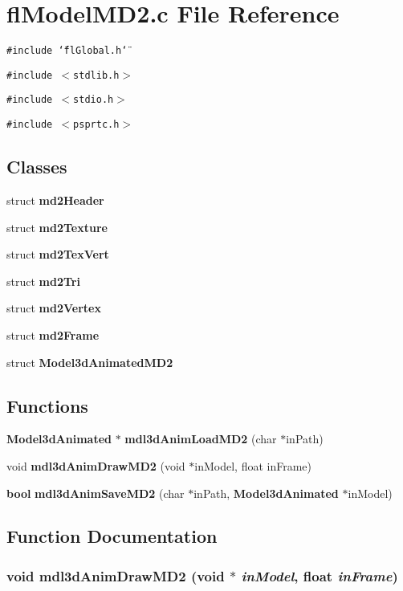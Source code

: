 \section{fl\-Model\-MD2.c File Reference}
\label{flModelMD2_8c}
{\tt \#include \char`\"{}fl\-Global.h\char`\"{}}\par
{\tt \#include $<$stdlib.h$>$}\par
{\tt \#include $<$stdio.h$>$}\par
{\tt \#include $<$psprtc.h$>$}\par
\subsection*{Classes}
\begin{CompactItemize}
\item 
struct {\bf md2Header}
\item 
struct {\bf md2Texture}
\item 
struct {\bf md2Tex\-Vert}
\item 
struct {\bf md2Tri}
\item 
struct {\bf md2Vertex}
\item 
struct {\bf md2Frame}
\item 
struct {\bf Model3d\-Animated\-MD2}
\end{CompactItemize}
\subsection*{Functions}
\begin{CompactItemize}
\item 
{\bf Model3d\-Animated} $\ast$ {\bf mdl3d\-Anim\-Load\-MD2} (char $\ast$in\-Path)
\item 
void {\bf mdl3d\-Anim\-Draw\-MD2} (void $\ast$in\-Model, float in\-Frame)
\item 
{\bf bool} {\bf mdl3d\-Anim\-Save\-MD2} (char $\ast$in\-Path, {\bf Model3d\-Animated} $\ast$in\-Model)
\end{CompactItemize}


\subsection{Function Documentation}
\subsubsection{\setlength{\rightskip}{0pt plus 5cm}void mdl3d\-Anim\-Draw\-MD2 (void $\ast$ {\em in\-Model}, float {\em in\-Frame})}\label{flModelMD2_8c_fe14c5983ff7ec31b62b50fc5c83eaf9}




